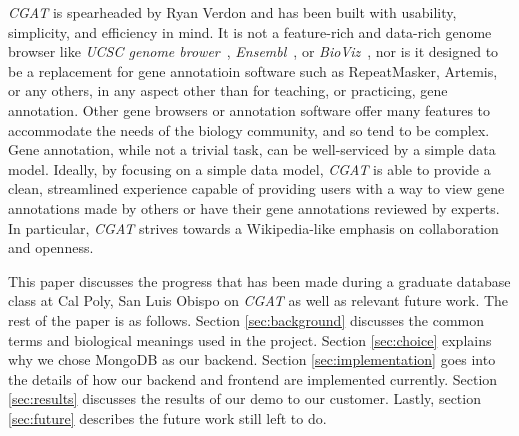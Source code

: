 \documentclass[10pt, conference, compsocconf]{IEEEtran}
\begin{document}
\textit{CGAT} is spearheaded by Ryan Verdon and has been built with usability,
simplicity, and efficiency in mind. It is not a feature-rich and data-rich
genome browser like \textit{UCSC genome brower}~\cite{ucscbrowser},
\textit{Ensembl}~\cite{ensembl}, or \textit{BioViz}~\cite{bioviz}, nor is it
designed to be a replacement for gene annotatioin software such as
RepeatMasker, Artemis, or any others, in any aspect other than for teaching, or
practicing, gene annotation. Other gene browsers or annotation software offer
many features to accommodate the needs of the biology community, and so tend to
be complex. Gene annotation, while not a trivial task, can be well-serviced by
a simple data model. Ideally, by focusing on a simple data model, \textit{CGAT}
is able to provide a clean, streamlined experience capable of providing users
with a way to view gene annotations made by others or have their gene
annotations reviewed by experts. In particular, \textit{CGAT} strives towards a
Wikipedia-like emphasis on collaboration and openness.

This paper discusses the progress that has been made during a graduate database
class at Cal Poly, San Luis Obispo on \textit{CGAT} as well as relevant future
work. The rest of the paper is as follows. Section \ref{sec:background}
discusses the common terms and biological meanings used in the project. Section
\ref{sec:choice} explains why we chose MongoDB as our backend. Section
\ref{sec:implementation} goes into the details of how our backend and frontend
are implemented currently. Section \ref{sec:results} discusses the results of
our demo to our customer. Lastly, section \ref{sec:future} describes the future
work still left to do.
\end{document}
